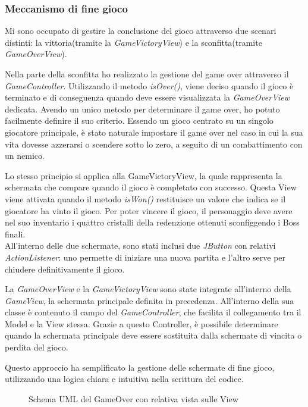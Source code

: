 \documentclass[a4paper,12pt]{report}
\begin{document}
\subsubsection{Meccanismo di fine gioco}
Mi sono occupato di gestire la conclusione del gioco attraverso due scenari distinti: la vittoria(tramite la \textit{GameVictoryView}) e la sconfitta(tramite \textit{GameOverView}).

Nella parte della sconfitta ho realizzato la gestione del game over attraverso il \textit{GameController}. Utilizzando il metodo \textit{isOver()}, viene deciso quando il gioco è terminato e di conseguenza quando deve essere visualizzata la \textit{GameOverView} dedicata. Avendo un unico metodo per determinare il game over, ho potuto facilmente definire il suo criterio. Essendo un gioco centrato su un singolo giocatore principale, è stato naturale impostare il game over nel caso in cui la sua vita dovesse azzerarsi o scendere sotto lo zero, a seguito di un combattimento con un nemico. 

Lo stesso principio si applica alla GameVictoryView, la quale rappresenta la schermata che compare quando il gioco è completato con successo. Questa View viene attivata quando il metodo \textit{isWon()} restituisce un valore che indica se il giocatore ha vinto il gioco. Per poter vincere il gioco, il personaggio deve avere nel suo inventario i quattro cristalli della redenzione ottenuti sconfiggendo i Boss finali.\\

All'interno delle due schermate, sono stati inclusi due \textit{JButton} con relativi \textit{ActionListener}: uno permette di iniziare una nuova partita e l'altro serve per chiudere definitivamente il gioco.

La \textit{GameOverView} e la \textit{GameVictoryView} sono state integrate all'interno della \textit{GameView}, la schermata principale definita in precedenza. All'interno della sua classe è contenuto il campo del \textit{GameController}, che facilita il collegamento tra il Model e la View stessa. Grazie a questo Controller, è possibile determinare quando la schermata principale deve essere sostituita dalla schermate di vincita o perdita del gioco.

Questo approccio ha semplificato la gestione delle schermate di fine gioco, utilizzando una logica chiara e intuitiva nella scrittura del codice.

\begin{figure}[H]
	\centering
	
	\caption{Schema UML del GameOver con relativa vista sulle View}
	\label{fig:the-exiled-victory_gameover-uml}
\end{figure}
\end{document}

